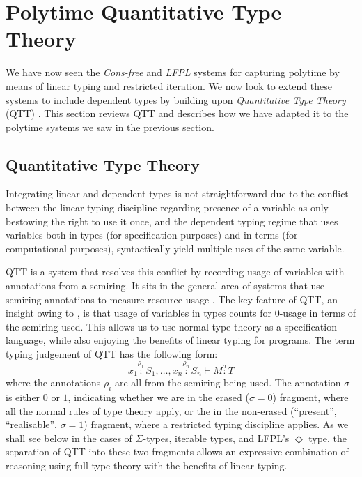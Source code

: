 \documentclass[acmsmall,screen]{acmart}
\begin{document}
\section{Polytime Quantitative Type Theory}
\label{sec:qtt}

We have now seen the \emph{Cons-free} and \emph{LFPL} systems for
capturing polytime by means of linear typing and restricted
iteration. We now look to extend these systems to include dependent
types by building upon \emph{Quantitative Type Theory} (QTT)
\cite{atkey18qtt,mcbride16}. This section reviews QTT and describes
how we have adapted it to the polytime systems we saw in the previous
section.

\subsection{Quantitative Type Theory}
\label{sec:qtt-basic}

Integrating linear and dependent types is not straightforward due to
the conflict between the linear typing discipline regarding presence
of a variable as only bestowing the right to use it once, and the
dependent typing regime that uses variables both in types (for
specification purposes) and in terms (for computational purposes),
syntactically yield multiple uses of the same variable.

QTT is a system that resolves this conflict by recording usage of
variables with annotations from a semiring. It sits in the general
area of systems that use semiring annotations to measure resource usage
\cite{BrunelGMZ14,GhicaS14,OrchardLE19}. The key feature of QTT, an
insight owing to \citet{mcbride16}, is that usage of variables in
types counts for $0$-usage in terms of the semiring used. This allows
us to use normal type theory as a specification language, while also
enjoying the benefits of linear typing for programs. The term typing
judgement of QTT has the following form:
\begin{displaymath}
  x_1 \stackrel{\rho_1}: S_1, \dots, x_n \stackrel{\rho_n}: S_n \vdash M \stackrel\sigma: T
\end{displaymath}
where the annotations $\rho_i$ are all from the semiring being
used. The annotation $\sigma$ is either $0$ or $1$, indicating whether
we are in the erased ($\sigma = 0$) fragment, where all the normal
rules of type theory apply, or the in the non-erased (``present'',
``realisable'', $\sigma = 1$) fragment, where a restricted typing
discipline applies.  As we shall see below in the cases of
$\Sigma$-types, iterable types, and LFPL's $\Diamond$ type, the
separation of QTT into these two fragments allows an expressive
combination of reasoning using full type theory with the benefits of
linear typing.
\end{document}
